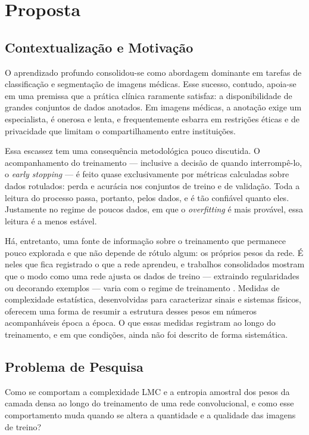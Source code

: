 \chapter{Proposta}
\label{cap:proposta}

\section{Contextualização e Motivação}
\label{sec:P-contexto}

O aprendizado profundo consolidou-se como abordagem dominante em tarefas de
classificação e segmentação de imagens médicas. Esse sucesso, contudo, apoia-se
em uma premissa que a prática clínica raramente satisfaz: a disponibilidade de
grandes conjuntos de dados anotados. Em imagens médicas, a anotação exige um
especialista, é onerosa e lenta, e frequentemente esbarra em restrições éticas
e de privacidade que limitam o compartilhamento entre instituições.

Essa escassez tem uma consequência metodológica pouco discutida. O
acompanhamento do treinamento --- inclusive a decisão de quando
interrompê-lo, o \emph{early stopping} \cite{prechelt1998} --- é feito quase
exclusivamente por métricas calculadas sobre dados rotulados: perda e acurácia
nos conjuntos de treino e de validação. Toda a leitura do processo passa,
portanto, pelos dados, e é tão confiável quanto eles. Justamente no regime de
poucos dados, em que o \emph{overfitting} é mais provável, essa leitura é a
menos estável.

Há, entretanto, uma fonte de informação sobre o treinamento que permanece pouco
explorada e que não depende de rótulo algum: os próprios pesos da rede. É neles
que fica registrado o que a rede aprendeu, e trabalhos consolidados mostram que
o modo como uma rede ajusta os dados de treino --- extraindo regularidades ou
decorando exemplos --- varia com o regime de
treinamento \cite{zhang2017, arpit2017}. Medidas de complexidade estatística,
desenvolvidas para caracterizar sinais e sistemas físicos, oferecem uma forma
de resumir a estrutura desses pesos em números acompanháveis época a época. O
que essas medidas registram ao longo do treinamento, e em que condições, ainda
não foi descrito de forma sistemática.

\section{Problema de Pesquisa}
\label{sec:P-problema}

Como se comportam a complexidade LMC e a entropia amostral dos pesos da camada
densa ao longo do treinamento de uma rede convolucional, e como esse
comportamento muda quando se altera a quantidade e a qualidade das imagens de
treino?

